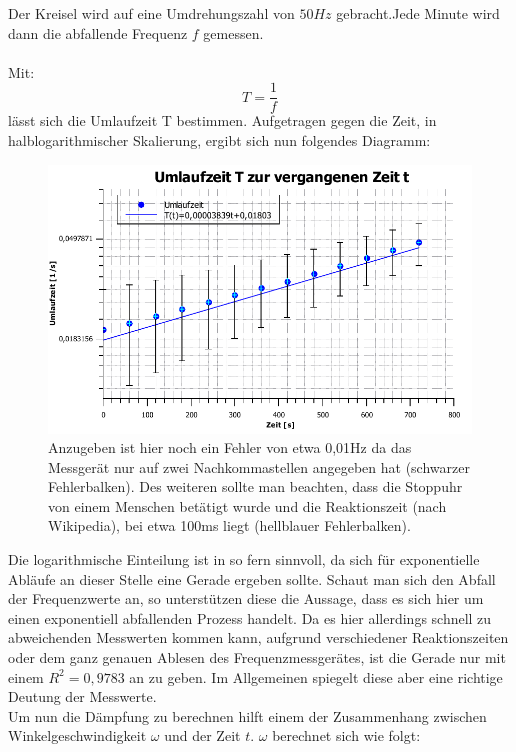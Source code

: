 \documentclass[a4paper]{scrartcl}
\begin{document}
Der Kreisel wird auf eine Umdrehungszahl von $50Hz$ gebracht.Jede Minute wird dann die abfallende Frequenz $f$ gemessen.\\
	\\
	Mit:
	$$ T=\frac{1}{f}$$ 
	lässt sich die Umlaufzeit T bestimmen. Aufgetragen gegen die Zeit, in halblogarithmischer Skalierung, ergibt sich nun folgendes Diagramm: \\
 \begin{figure}[H]
\includegraphics[width=1\textwidth]{T_gegen_t.pdf}
\caption{\label{fig:T_gegen_t}Anzugeben ist hier noch ein Fehler von etwa 0,01Hz da das Messgerät nur auf zwei Nachkommastellen angegeben hat (schwarzer Fehlerbalken). Des weiteren sollte man beachten, dass die Stoppuhr von einem Menschen betätigt wurde und die Reaktionszeit (nach Wikipedia), bei etwa 100ms liegt (hellblauer Fehlerbalken).}
\end{figure}
   
   Die logarithmische Einteilung ist in so fern sinnvoll, da sich für exponentielle Abläufe an dieser Stelle eine Gerade ergeben sollte. Schaut man sich den Abfall der Frequenzwerte an, so unterstützen diese die Aussage, dass es sich hier um einen exponentiell abfallenden Prozess handelt. Da es hier allerdings schnell zu abweichenden Messwerten kommen kann, aufgrund verschiedener Reaktionszeiten oder dem ganz genauen Ablesen des Frequenzmessgerätes, ist die Gerade nur mit einem $R^2=0,9783$ an zu geben. Im Allgemeinen spiegelt diese aber eine richtige Deutung der Messwerte.\\
	
	Um nun die Dämpfung zu berechnen hilft einem der Zusammenhang zwischen Winkelgeschwindigkeit $\omega$ und der Zeit $t$. $\omega$  berechnet sich wie folgt:
	
\end{document}

